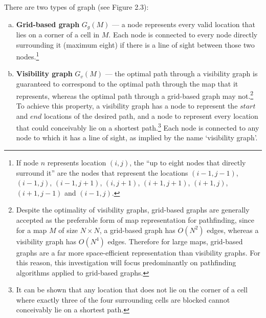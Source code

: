 \documentclass[12pt,notitlepage]{report}
\begin{document}
\noindent
There are two types of graph (see Figure 2.3):
\begin{enumerate}[(a)]
\item{\bfseries Grid-based graph} $G_{g}(M)$ --- a node represents every valid location that lies on a corner of a cell in $M$. Each node is connected to every node directly surrounding it (maximum eight) if there is a line of sight between those two nodes.\footnote{If node $n$ represents location $(i,j)$, the ``up to eight nodes that directly surround it'' are the nodes that represent the locations $(i-1,j-1)$, $(i-1,j)$, $(i-1,j+1)$, $(i,j+1)$, $(i+1,j+1)$, $(i+1,j)$, $(i+1,j-1)$ and $(i-1,j)$.}\\

\item{\bfseries Visibility graph} $G_{v}(M)$ --- the optimal path through a visibility graph is guaranteed to correspond to the optimal path through the map that it represents, whereas the optimal path through a grid-based graph may not\cite{Nash12}.\footnote{Despite the optimality of visibility graphs, grid-based graphs are generally accepted as the preferable form of map representation for pathfinding, since for a map $M$ of size $N \times N$, a grid-based graph has {$O(N^{2})$} edges, whereas a visibility graph has {$O(N^{4})$} edges. Therefore for large maps, grid-based graphs are a far more space-efficient representation than visibility graphs. For this reason, this investigation will focus predominantly on pathfinding algorithms applied to grid-based graphs.} To achieve this property, a visibility graph has a node to represent the $start$ and $end$ locations of the desired path, and a node to represent every location that could conceivably lie on a shortest path.\footnote{It can be shown\cite{Nash12} that any location that does not lie on the corner of a cell where exactly three of the four surrounding cells are blocked cannot conceivably lie on a shortest path.} Each node is connected to any node to which it has a line of sight, as implied by the name `visibility graph'.\\

\end{enumerate}
\end{document}
